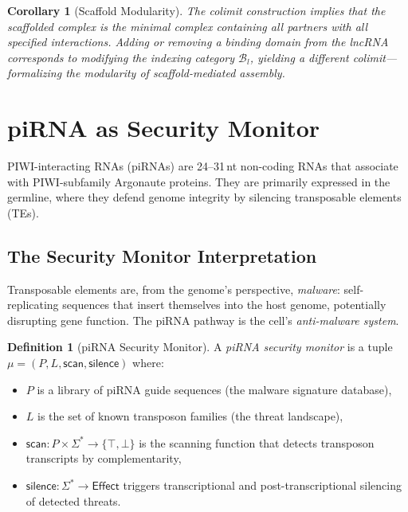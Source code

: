\documentclass[12pt,a4paper]{article}
\newtheorem{corollary}[theorem]{Corollary}
\theoremstyle{definition}
\newtheorem{definition}[theorem]{Definition}
\begin{document}
\begin{corollary}[Scaffold Modularity]
The colimit construction implies that the scaffolded complex is the
\emph{minimal} complex containing all partners with all specified
interactions.  Adding or removing a binding domain from the lncRNA
corresponds to modifying the indexing category $\mathcal{B}_l$,
yielding a different colimit---formalizing the modularity of
scaffold-mediated assembly.
\end{corollary}

\section{piRNA as Security Monitor}\label{sec:pirna}

PIWI-interacting RNAs (piRNAs) are 24--31\,nt non-coding RNAs that
associate with PIWI-subfamily Argonaute proteins.  They are primarily
expressed in the germline, where they defend genome integrity by
silencing transposable elements (TEs).

\subsection{The Security Monitor Interpretation}

Transposable elements are, from the genome's perspective, \emph{malware}:
self-replicating sequences that insert themselves into the host genome,
potentially disrupting gene function.  The piRNA pathway is the cell's
\emph{anti-malware system}.

\begin{definition}[piRNA Security Monitor]\label{def:pirna-monitor}
A \emph{piRNA security monitor} is a tuple $\mu = (P, L, \mathsf{scan},
\mathsf{silence})$ where:
\begin{itemize}
  \item $P$ is a library of piRNA guide sequences (the malware
    signature database),
  \item $L$ is the set of known transposon families (the threat
    landscape),
  \item $\mathsf{scan} : P \times \Sigma^* \to \{\top, \bot\}$ is the
    scanning function that detects transposon transcripts by
    complementarity,
  \item $\mathsf{silence} : \Sigma^* \to \mathsf{Effect}$ triggers
    transcriptional and post-transcriptional silencing of detected
    threats.
\end{itemize}
\end{definition}
\end{document}
